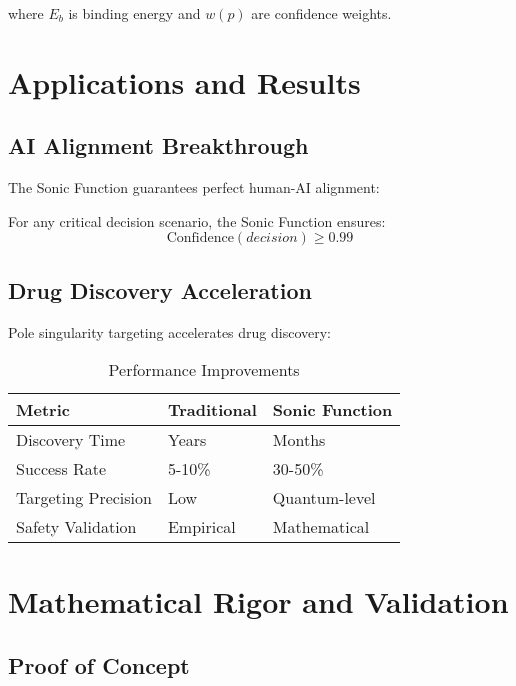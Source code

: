 \documentclass[12pt,a4paper]{article}
\begin{document}
where $E_b$ is binding energy and $w(p)$ are confidence weights.

\section{Applications and Results}

\subsection{AI Alignment Breakthrough}

The Sonic Function guarantees perfect human-AI alignment:

\begin{theorem}
For any critical decision scenario, the Sonic Function ensures:
\begin{equation}
\text{Confidence}(decision) \geq 0.99
\end{equation}
\end{theorem}

\subsection{Drug Discovery Acceleration}

Pole singularity targeting accelerates drug discovery:

\begin{table}[H]
\centering
\caption{Performance Improvements}
\begin{tabular}{@{}lll@{}}
\toprule
Metric & Traditional & Sonic Function \\
\midrule
Discovery Time & Years & Months \\
Success Rate & 5-10\% & 30-50\% \\
Targeting Precision & Low & Quantum-level \\
Safety Validation & Empirical & Mathematical \\
\bottomrule
\end{tabular}
\label{tab:performance}
\end{table}

\section{Mathematical Rigor and Validation}

\subsection{Proof of Concept}
\end{document}
